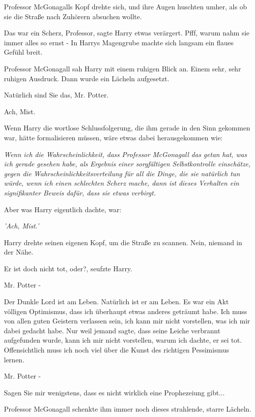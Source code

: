Professor McGonagalls Kopf drehte sich, und ihre Augen huschten umher, als ob
sie die Straße nach Zuhörern absuchen wollte.

\glqq{}Das war ein Scherz, Professor\grqq{}, sagte Harry etwas verärgert. Pfff,
warum nahm sie immer alles so ernst - In Harrys Magengrube machte sich langsam
ein flaues Gefühl breit.

Professor McGonagall sah Harry mit einem ruhigen Blick an. Einem sehr, sehr
ruhigen Ausdruck. Dann wurde ein Lächeln aufgesetzt.

\glqq{}Natürlich sind Sie das, Mr. Potter.\grqq{}

Ach, Mist.

Wenn Harry die wortlose Schlussfolgerung, die ihm gerade in den Sinn gekommen
war, hätte formalisieren müssen, wäre etwas dabei herausgekommen wie:

\glqq{}\emph{Wenn ich die Wahrscheinlichkeit, dass Professor McGonagall das
getan hat, was ich gerade gesehen habe, als Ergebnis einer sorgfältigen
Selbstkontrolle einschätze, gegen die Wahrscheinlichkeitsverteilung für all die
Dinge, die sie natürlich tun würde, wenn ich einen schlechten Scherz mache, dann
ist dieses Verhalten ein signifikanter Beweis dafür, dass sie etwas
verbirgt.\grqq{}}

Aber was Harry eigentlich dachte, war:

\emph{'Ach, Mist.'}

Harry drehte seinen eigenen Kopf, um die Straße zu scannen. Nein, niemand in der
Nähe.

\glqq{}Er ist doch nicht tot, oder?\grqq{}, seufzte Harry.

\glqq{}Mr. Potter -\grqq{}

\glqq{}Der Dunkle Lord ist am Leben. Natürlich ist er am Leben. Es war ein Akt
völligen Optimismus, dass ich überhaupt etwas anderes geträumt habe. Ich muss
von allen guten Geistern verlassen sein, ich kann mir nicht vorstellen, was ich
mir dabei gedacht habe. Nur weil jemand sagte, dass seine Leiche verbrannt
aufgefunden wurde, kann ich mir nicht vorstellen, warum ich dachte, er sei tot.
Offensichtlich muss ich noch viel über die Kunst des richtigen Pessimismus
lernen.\grqq{}

\glqq{}Mr. Potter -\grqq{}

\glqq{}Sagen Sie mir wenigstens, dass es nicht wirklich eine Prophezeiung
gibt...\grqq{}

Professor McGonagall schenkte ihm immer noch dieses strahlende, starre Lächeln.

